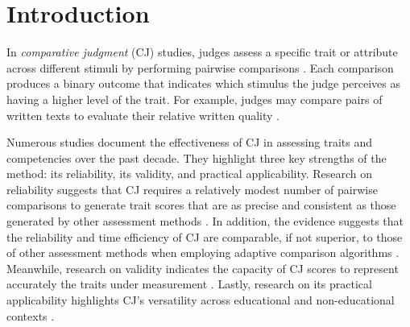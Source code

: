\documentclass[
  authoryear,
  review,
  1p]{elsarticle}
\begin{document}
\newcommand{\dsep}{\:\bot\:}
\newcommand{\ndsep}{\:\not\bot\:}

\section{Introduction}\label{sec-introduction}

In \emph{comparative judgment} (CJ) studies, judges assess a specific
trait or attribute across different stimuli by performing pairwise
comparisons \citep{Thurstone_1927a, Thurstone_1927b}. Each comparison
produces a binary outcome that indicates which stimulus the judge
perceives as having a higher level of the trait. For example, judges may
compare pairs of written texts to evaluate their relative written
quality
\citep{Pollitt_2012b, vanDaal_et_al_2016, Lesterhuis_2018_thesis, Coertjens_et_al_2017, Goossens_et_al_2018, Bouwer_et_al_2023}.

Numerous studies document the effectiveness of CJ in assessing traits
and competencies over the past decade. They highlight three key
strengths of the method: its reliability, its validity, and practical
applicability. Research on reliability suggests that CJ requires a
relatively modest number of pairwise comparisons
\citep{Verhavert_et_al_2019, Crompvoets_et_al_2022} to generate trait
scores that are as precise and consistent as those generated by other
assessment methods
\citep{Coertjens_et_al_2017, Goossens_et_al_2018, Bouwer_et_al_2023}. In
addition, the evidence suggests that the reliability and time efficiency
of CJ are comparable, if not superior, to those of other assessment
methods when employing adaptive comparison algorithms
\citep{Pollitt_2012b, Verhavert_et_al_2022, Mikhailiuk_et_al_2021}.
Meanwhile, research on validity indicates the capacity of CJ scores to
represent accurately the traits under measurement
\citep{Whitehouse_2012, vanDaal_et_al_2016, Lesterhuis_2018_thesis, Bartholomew_et_al_2018, Bouwer_et_al_2023}.
Lastly, research on its practical applicability highlights CJ's
versatility across educational and non-educational contexts \citep[as
seen
in][]{Maydeu-Olivares_et_al_2005, Kimbell_2012, Jones_et_al_2015, Bartholomew_et_al_2018, Jones_et_al_2019, Zucco_et_al_2019, Marshall_et_al_2020, Bartholomew_et_al_2020b, Boonen_et_al_2020, Pritikin_2020, Schramm_et_al_2021, Seymour_et_al_2022, Seymour_et_al_2025}.
\end{document}
